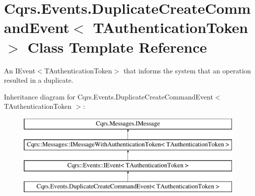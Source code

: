 \hypertarget{classCqrs_1_1Events_1_1DuplicateCreateCommandEvent}{}\section{Cqrs.\+Events.\+Duplicate\+Create\+Command\+Event$<$ T\+Authentication\+Token $>$ Class Template Reference}
\label{classCqrs_1_1Events_1_1DuplicateCreateCommandEvent}


An I\+Event$<$\+T\+Authentication\+Token$>$ that informs the system that an operation resulted in a duplicate.  


Inheritance diagram for Cqrs.\+Events.\+Duplicate\+Create\+Command\+Event$<$ T\+Authentication\+Token $>$\+:\begin{figure}[H]
\begin{center}
\leavevmode
\includegraphics[height=4.000000cm]{classCqrs_1_1Events_1_1DuplicateCreateCommandEvent}
\end{center}
\end{figure}
